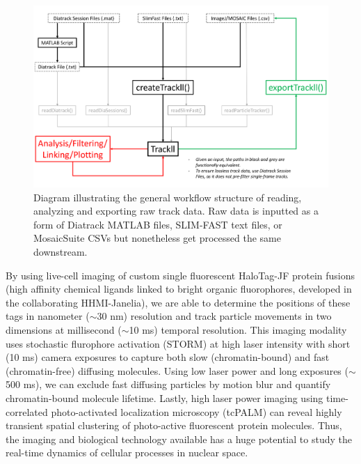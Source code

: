 \documentclass{bioinfo}
\begin{document}
\begin{figure}[!tpb]
\centerline{\includegraphics[width=120mm]{pipeline.png}}
\caption{Diagram illustrating the general workflow structure of reading, analyzing and exporting raw track data. Raw data is inputted as a form of Diatrack MATLAB files, SLIM-FAST text files, or MosaicSuite CSVs but nonetheless get processed the same downstream.}\label{fig:02}
\end{figure}

By using live-cell imaging of custom single fluorescent HaloTag-JF protein fusions (high affinity chemical ligands linked to bright organic fluorophores, developed in the collaborating HHMI-Janelia), we are able to determine the positions of these tags in nanometer ($\sim$30 nm) resolution and track particle movements in two dimensions at millisecond ($\sim$10 ms) temporal resolution. This imaging modality uses stochastic flurophore activation (STORM) at high laser intensity with short (10 ms) camera exposures to capture both slow (chromatin-bound) and fast (chromatin-free) diffusing molecules. Using low laser power and long exposures ($\sim$500 ms), we can exclude fast diffusing particles by motion blur and quantify chromatin-bound molecule lifetime. Lastly, high laser power imaging using time-correlated photo-activated localization microscopy (tcPALM) can reveal highly transient spatial clustering of photo-active fluorescent protein molecules. Thus, the imaging and biological technology available has a huge potential to study the real-time dynamics of cellular processes in nuclear space.
\end{document}
